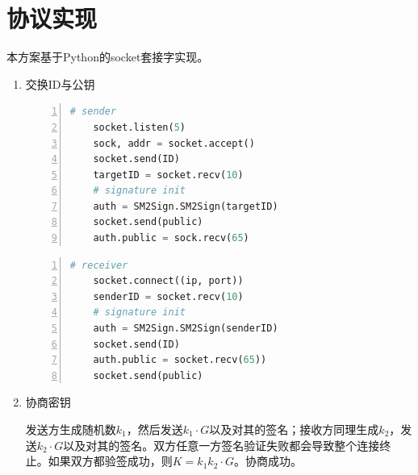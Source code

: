 \documentclass[11pt]{ctexart}
\begin{document}
\section{协议实现} %
\label{sec:协议实现}
本方案基于Python的socket套接字实现。
\begin{enumerate}
    \item 交换ID与公钥

    \begin{paracol}{2}
    \begin{lstlisting}[language={python},
    numbers=left,
    numberstyle=\tiny\monaco,
    basicstyle=\small\monaco]
    # sender
    socket.listen(5)
    sock, addr = socket.accept()
    socket.send(ID)
    targetID = socket.recv(10)
    # signature init
    auth = SM2Sign.SM2Sign(targetID) 
    socket.send(public)
    auth.public = sock.recv(65)
    \end{lstlisting}
    \switchcolumn
    \begin{lstlisting}[language={python},
    numbers=left,
    numberstyle=\tiny\monaco,
    basicstyle=\small\monaco]
    # receiver
    socket.connect((ip, port))
    senderID = socket.recv(10)
    # signature init
    auth = SM2Sign.SM2Sign(senderID) 
    socket.send(ID)
    auth.public = socket.recv(65))
    socket.send(public)
    \end{lstlisting}
    \end{paracol}
    \item 协商密钥

    发送方生成随机数$k_1$，然后发送$k_1 \cdot G$以及对其的签名；接收方同理生成$k_2$，发送$k_2 \cdot G$以及对其的签名。双方任意一方签名验证失败都会导致整个连接终止。如果双方都验签成功，则$K = k_1k_2 \cdot G$。协商成功。


\end{enumerate}
\end{document}
